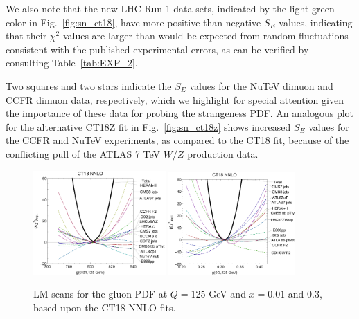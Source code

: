 We also note that the new LHC Run-1 data sets, indicated by the
light green color in Fig.~\ref{fig:sn_ct18}, have more positive than
negative $S_E$ values, indicating that their $\chi^2$ values are larger
than would be expected from random fluctuations consistent with the published experimental errors, as can be verified by consulting Table~\ref{tab:EXP_2}.

Two squares and two stars indicate the $S_E$ values for the NuTeV dimuon and CCFR dimuon data,
respectively, which we highlight for special attention given the importance of these data for probing the strangeness PDF. An analogous plot for the alternative CT18Z fit in Fig.~\ref{fig:sn_ct18z} shows increased $S_E$ values for the CCFR and NuTeV experiments, as compared to the CT18 fit, because of the conflicting pull of the ATLAS 7 TeV $W/Z$ production data. 

\begin{figure}[p]
  \hspace*{-0.6cm}\includegraphics[width=0.45\textwidth]{./fig/gMHT_scanCT18.pdf}\quad
  \includegraphics[width=0.43\textwidth]{./fig/gx0p3_scanCT18.pdf}
	\caption{LM scans for the gluon PDF at $Q=125$ GeV and $x=0.01$ and $0.3$, based upon the CT18 NNLO fits.
		\label{fig:LMg18}}
\end{figure}


